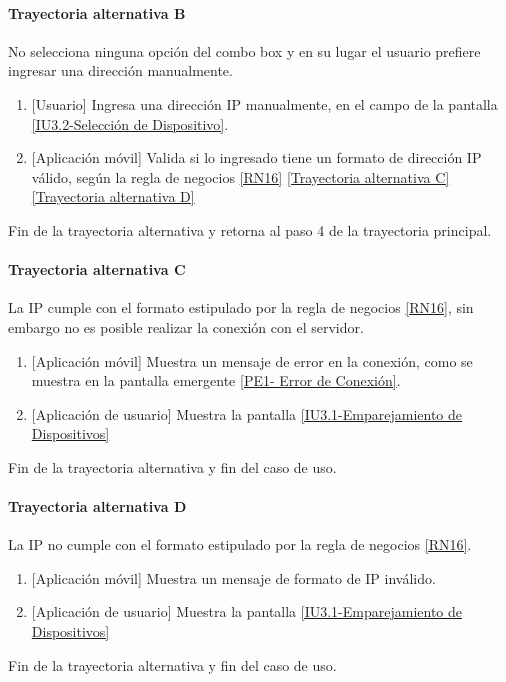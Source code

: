 \paragraph{Trayectoria alternativa B} \label{SUB-U-CU1.4:TB}
	No selecciona ninguna opción del combo box y en su lugar el usuario prefiere ingresar una dirección manualmente.
	\begin{enumerate}[label=B\arabic*.]
		\item {[Usuario]}  Ingresa una dirección IP manualmente, en el campo de la pantalla \hyperref[fig:Seleccion de Disposotivo]{[IU3.2-Selección de Dispositivo]}.
		\item {[Aplicación móvil]} Valida si lo ingresado tiene un formato de dirección IP válido, según la regla de negocios \ref{RN16} \hyperref[SUB-U-CU1.4:TC]{[Trayectoria alternativa C]} \hyperref[SUB-U-CU1.4:TD]{[Trayectoria alternativa D]} 
	\end{enumerate}
	Fin de la trayectoria alternativa y retorna al paso 4 de la trayectoria principal.

\paragraph{Trayectoria alternativa C} \label{SUB-U-CU1.4:TC}
    La IP cumple con el formato estipulado por la regla de negocios \ref{RN16}, sin embargo no es posible realizar la conexión con el servidor.
    \begin{enumerate}[label=C\arabic*.]
		\item {[Aplicación móvil]} Muestra un mensaje de error en la conexión, como se muestra en la pantalla emergente \hyperref[fig:Error de Conexion]{[PE1- Error de Conexión]}.
		\item {[Aplicación de usuario]} Muestra la pantalla \hyperref[fig:Emparejamiento Dispositivos]{[IU3.1-Emparejamiento de Dispositivos]}
	\end{enumerate}
	Fin de la trayectoria alternativa y fin del caso de uso.
	
\paragraph{Trayectoria alternativa D} \label{SUB-U-CU1.4:TD}
    La IP no cumple con el formato estipulado por la regla de negocios \ref{RN16}.
    \begin{enumerate}[label=D\arabic*.]
		\item {[Aplicación móvil]} Muestra un mensaje de formato de IP inválido.
		\item {[Aplicación de usuario]} Muestra la pantalla \hyperref[fig:Emparejamiento Dispositivos]{[IU3.1-Emparejamiento de Dispositivos]}
	\end{enumerate}
	Fin de la trayectoria alternativa y fin del caso de uso.